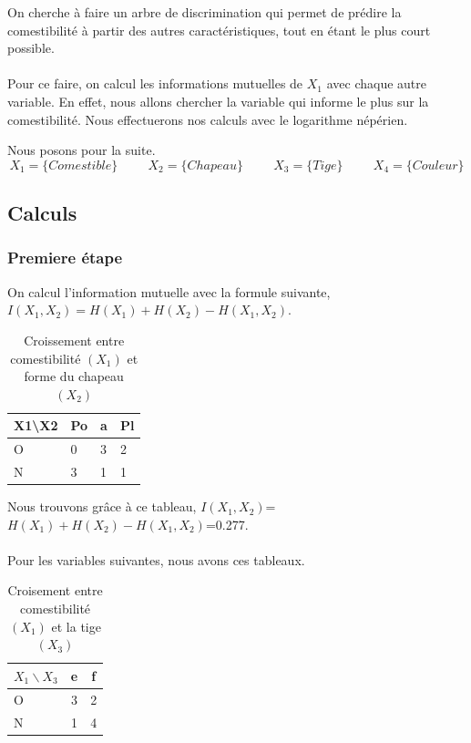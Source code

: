 \documentclass{article}
\begin{document}
  On cherche à faire un arbre de discrimination qui permet de prédire la comestibilité à partir des autres caractéristiques, tout en étant le plus court possible.
  \\
  \\
  Pour ce faire, on calcul les informations mutuelles de $X_1$ avec chaque autre variable.
  En effet, nous allons chercher la variable qui informe le plus sur la comestibilité. Nous effectuerons nos calculs avec le logarithme népérien.

Nous posons pour la suite.
\[
X_1 = \{Comestible\} \hspace{1cm} X_2 = \{Chapeau\} \hspace{1cm} X_3 = \{Tige\} \hspace{1cm} X_4 = \{Couleur\}
\]

\subsection{Calculs}

\subsubsection{Premiere étape}
On calcul l'information mutuelle avec la formule suivante, $I(X_1,X_2) = H(X_1) + H(X_2) - H(X_1,X_2)$.

\begin{table}[H]
  \centering
    \caption{Croissement entre comestibilité $(X_1)$ et forme du chapeau $(X_2)$}
    \begin{tabular}{|l|l|l|l|}
    \hline
    X1\textbackslash{}X2 & Po & a & Pl \\ \hline
    O                    & 0  & 3 & 2  \\ \hline
    N                    & 3  & 1 & 1  \\ \hline
    \end{tabular}
\end{table}
Nous trouvons grâce à ce tableau, $I(X_1,X_2)$=$H(X_1)+H(X_2)-H(X_1,X_2)$=0.277.
\\\\
Pour les variables suivantes, nous avons ces tableaux.

\begin{table}[H]
  \centering
    \caption{Croisement entre comestibilité $(X_1)$ et la tige $(X_3)$}
    \begin{tabular}{|l|c|c|}
    \hline
    $X_1 \backslash X_3$ & e & f \\ \hline
    O                    & 3  & 2  \\ \hline
    N                    & 1  & 4  \\ \hline
    \end{tabular}
\end{table}
\end{document}
